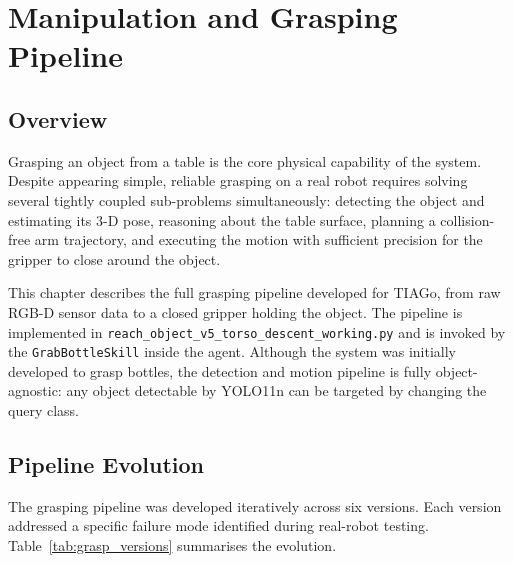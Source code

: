 
\chapter{Manipulation and Grasping Pipeline}
\label{ch:manipulation}

\section{Overview}

Grasping an object from a table is the core physical capability of the system.
Despite appearing simple, reliable grasping on a real robot requires solving several
tightly coupled sub-problems simultaneously: detecting the object and estimating its
3-D pose, reasoning about the table surface, planning a collision-free arm trajectory,
and executing the motion with sufficient precision for the gripper to close around the
object.

This chapter describes the full grasping pipeline developed for TIAGo, from raw RGB-D
sensor data to a closed gripper holding the object.
The pipeline is implemented in \texttt{reach\_object\_v5\_torso\_descent\_working.py}
and is invoked by the \texttt{GrabBottleSkill} inside the agent.
Although the system was initially developed to grasp bottles, the detection and motion
pipeline is fully object-agnostic: any object detectable by YOLO11n can be targeted
by changing the query class.

\section{Pipeline Evolution}

The grasping pipeline was developed iteratively across six versions.
Each version addressed a specific failure mode identified during real-robot testing.
Table~\ref{tab:grasp_versions} summarises the evolution.

